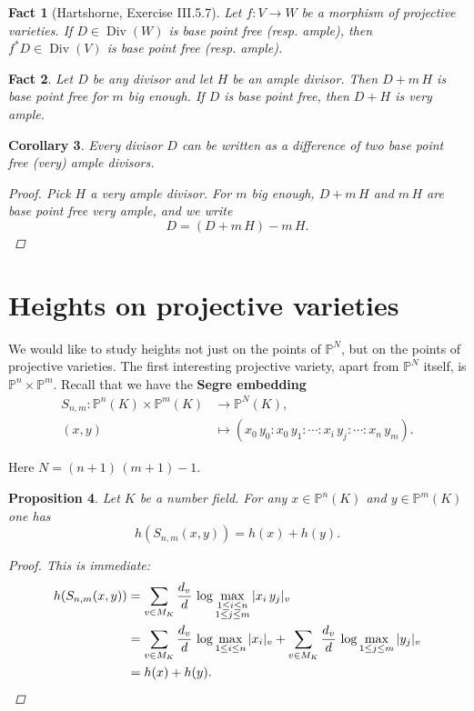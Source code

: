 \documentclass{article}
\newtheorem{proposition}{Proposition}[section]
\newtheorem{fact}[proposition]{Fact}
\newtheorem{corollary}[proposition]{Corollary}
\theoremstyle{definition}
\DeclareMathOperator{\Div}{Div}
\newcommand{\term}{\textbf}
\newcommand{\PP}{\mathbb{P}}
\begin{document}
\begin{fact}[Hartshorne, Exercise III.5.7]
  \label{fact:image-of-bpf}
  Let $f\colon V\to W$ be a morphism of projective varieties. If
  $D \in \Div (W)$ is base point free (resp. ample), then $f^* D\in \Div (V)$ is
  base point free (resp. ample).
\end{fact}

\begin{fact}
  \label{fact:ample-divisors}
  Let $D$ be any divisor and let $H$ be an ample divisor.
  Then $D + m\,H$ is base point free for $m$ big enough.
  If $D$ is base point free, then $D + H$ is very ample.
\end{fact}

\begin{corollary}
  \label{corollary:difference-of-bpf-very-ample}
  Every divisor $D$ can be written as a difference of two base point free (very)
  ample divisors.

  \begin{proof}
    Pick $H$ a very ample divisor. For $m$ big enough, $D + m\,H$ and $m\,H$ are
    base point free very ample, and we write
    $$D = (D + m\,H) - m\,H.$$
  \end{proof}
\end{corollary}

\section{Heights on projective varieties}

We would like to study heights not just on the points of $\PP^N$, but on the
points of projective varieties. The first interesting projective variety, apart
from $\PP^N$ itself, is $\PP^n\times \PP^m$. Recall that we have the
\term{Segre embedding}
\begin{align*}
  S_{n,m}\colon \PP^n (K) \times \PP^m (K) & \to \PP^N (K),\\
  (x,y) & \mapsto (x_0\,y_0 : x_0\,y_1 : \cdots : x_i\,y_j : \cdots : x_n\,y_m).
\end{align*}

Here $N = (n+1)\,(m+1) - 1$.

\begin{proposition}
  \label{proposition:height-and-segre}
  Let $K$ be a number field. For any $x \in \PP^n (K)$ and $y \in \PP^m (K)$ one
  has
  $$h (S_{n,m} (x,y)) = h(x) + h(y).$$

  \begin{proof}
    This is immediate:
    \begin{align*}
      h (S_{n,m} (x,y)) & = \sum_{v\in M_K} \frac{d_v}{d} \, \log \max_{\substack{1 \le i \le n \\ 1 \le j \le m}} |x_i\,y_j|_v\\
                        & = \sum_{v\in M_K} \frac{d_v}{d} \, \log \max_{1 \le i \le n} |x_i|_v + \sum_{v\in M_K} \frac{d_v}{d} \, \log \max_{1 \le j \le m} |y_j|_v\\
                        & = h (x) + h (y). \qedhere
    \end{align*}
  \end{proof}
\end{proposition}
\end{document}
